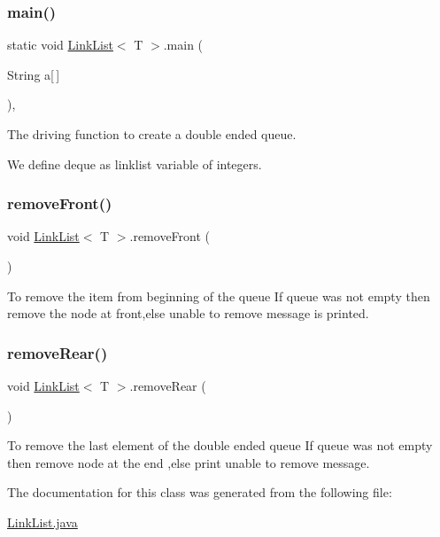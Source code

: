 \subsubsection{\texorpdfstring{main()}{main()}}
{\footnotesize\ttfamily static void \hyperlink{classLinkList}{Link\+List}$<$ T $>$.main (\begin{DoxyParamCaption}\item[{String}]{a\mbox{[}$\,$\mbox{]} }\end{DoxyParamCaption})\hspace{0.3cm}{\ttfamily [inline]}, {\ttfamily [static]}}



The driving function to create a double ended queue. 

We define deque as linklist variable of integers. \mbox{\label{classLinkList_ae4d698669105fff350b578de53e7e389}} 
\subsubsection{\texorpdfstring{remove\+Front()}{removeFront()}}
{\footnotesize\ttfamily void \hyperlink{classLinkList}{Link\+List}$<$ T $>$.remove\+Front (\begin{DoxyParamCaption}{ }\end{DoxyParamCaption})\hspace{0.3cm}{\ttfamily [inline]}}

To remove the item from beginning of the queue If queue was not empty then remove the node at front,else unable to remove message is printed. \mbox{\label{classLinkList_af7894809851c2478fdb3272bd0584b6c}} 
\subsubsection{\texorpdfstring{remove\+Rear()}{removeRear()}}
{\footnotesize\ttfamily void \hyperlink{classLinkList}{Link\+List}$<$ T $>$.remove\+Rear (\begin{DoxyParamCaption}{ }\end{DoxyParamCaption})\hspace{0.3cm}{\ttfamily [inline]}}

To remove the last element of the double ended queue If queue was not empty then remove node at the end ,else print unable to remove message. 

The documentation for this class was generated from the following file\+:\begin{DoxyCompactItemize}
\item 
\hyperlink{LinkList_8java}{Link\+List.\+java}\end{DoxyCompactItemize}
